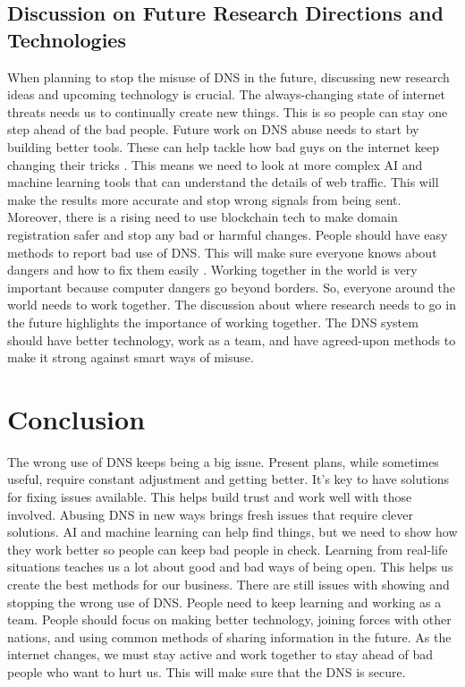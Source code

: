 \subsection{Discussion on Future Research Directions and Technologies}

When planning to stop the misuse of DNS in the future, discussing new research ideas and upcoming technology is crucial. The always-changing state of internet threats needs us to continually create new things. This is so people can stay one step ahead of the bad people. Future work on DNS abuse needs to start by building better tools. These can help tackle how bad guys on the internet keep changing their tricks \cite{bovenzi2023blockchain}. This means we need to look at more complex AI and machine learning tools that can understand the details of web traffic. This will make the results more accurate and stop wrong signals from being sent. Moreover, there is a rising need to use blockchain tech to make domain registration safer and stop any bad or harmful changes. People should have easy methods to report bad use of DNS. This will make sure everyone knows about dangers and how to fix them easily \cite{gu2021iot}. Working together in the world is very important because computer dangers go beyond borders. So, everyone around the world needs to work together. The discussion about where research needs to go in the future highlights the importance of working together. The DNS system should have better technology, work as a team, and have agreed-upon methods to make it strong against smart ways of misuse.


\section{Conclusion}

The wrong use of DNS keeps being a big issue. Present plans, while sometimes useful, require constant adjustment and getting better. It's key to have solutions for fixing issues available. This helps build trust and work well with those involved. Abusing DNS in new ways brings fresh issues that require clever solutions. AI and machine learning can help find things, but we need to show how they work better so people can keep bad people in check. Learning from real-life situations teaches us a lot about good and bad ways of being open. This helps us create the best methods for our business. There are still issues with showing and stopping the wrong use of DNS. People need to keep learning and working as a team. People should focus on making better technology, joining forces with other nations, and using common methods of sharing information in the future. As the internet changes, we must stay active and work together to stay ahead of bad people who want to hurt us. This will make sure that the DNS is secure.

